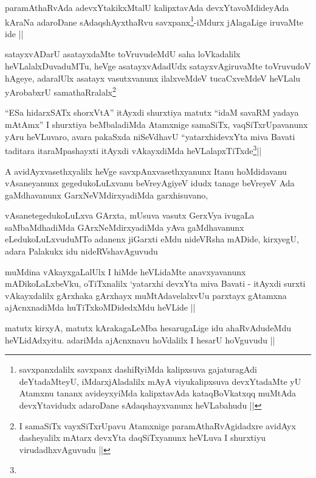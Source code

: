 \begin{artha}
paramAthaRvAda adevxYtakikxMtalU kalipxtavAda devxYtavoMdideyAda
kAraNa adaroDane sAdaqshAyxthaRvu savxpanx\footnote[1]{savxpanxdalilx
  savxpanx dashiRyiMda kalipxsuva gajaturagAdi deYtadaMteyU,
  iMdarxjAladalilx mAyA viyukalipxsuva devxYtadaMte yU  Atamxnu tananx
avideyxyiMda kalipxtavAda kataqBoVkatxqq muMtAda devxYtavidudx
adaroDane sAdaqshayxvanunx heVLabahudu ||}-iMdurx jAlagaLige iruvaMte
ide ||
\end{artha}


\begin{artha}
satayxvADarU asatayxdaMte toVruvudeMdU saha loVkadalilx
heVLalalxDuvaduMTu, heVge asatayxvAdadUdx satayxvAgiruvaMte toVruvudoV
hAgeye, adaralUlx asatayx vasutxvanunx ilalxveMdeV tucaCxveMdeV
heVLalu yArobabxrU samathaRralalx\footnote[1]{I samaSiTx
  vayxSiTxrUpavu Atamxnige paramAthaRvAgidadxre avidAyx dasheyalilx
  mAtarx devxYta daqSiTxyanunx heVLuva I shurxtiyu virudadhxvAguvudu ||}
\end{artha}

\begin{artha}
``ESa hidarxSATx shorxVtA'' itAyxdi shurxtiya matutx ``idaM savaRM
  yadaya mAtAmx'' I shurxtiya beMbaladiMda Atamxnige samaSiTx,
  vaqSiTxrUpavanunx yAru heVLuvaro, avara pakaSxda niSeVdhavU
  ``yatarxhidevxYta  miva Bavati taditara itaraMpashayxti itAyxdi
  vAkayxdiMda heVLalapxTiTxde\footnote[1]{}||
\end{artha}

\begin{artha}
A avidAyxvasethxyalilx heVge savxpAnxvasethxyanunx Itanu hoMdidavanu
vAsaneyanunx gegedukoLuLxvanu beVreyAgiyeV idudx tanage beVreyeV Ada
gaMdhavanunx GarxNeVMdirxyadiMda garxhisuvano,
\end{artha}

\begin{artha}
vAsanetegedukoLuLxva GArxta, mUsuva vasutx GerxVya ivugaLa
saMbaMdhadiMda GArxNeMdirxyadiMda yAva gaMdhavanunx eLedukoLuLxvuduMTo
adanenx jiGarxti eMdu nideVRsha mADide, kirxyegU, adara Palakukx idu nideRVshavAguvudu
\end{artha}

\begin{artha}
muMdina vAkayxgaLalUlx I hiMde heVLidaMte anavxyavanunx
mADikoLaLxbeVku, oTiTxnalilx `yatarxhi devxYta miva Bavati - itAyxdi
surxti vAkayxdalilx gArxhaka gArxhayx muMtAdavelalxvUu parxtayx
gAtamxna ajAcnxnadiMda huTiTxkoMDidedxMdu heVLide ||

\end{artha}
matutx kirxyA, matutx kArakagaLeMba hesarugaLige idu ahaRvAdudeMdu
heVLidAdxyitu. adariMda ajAcnxnavu hoVdalilx I hesarU hoVguvudu ||
\begin{artha}

\end{artha}


